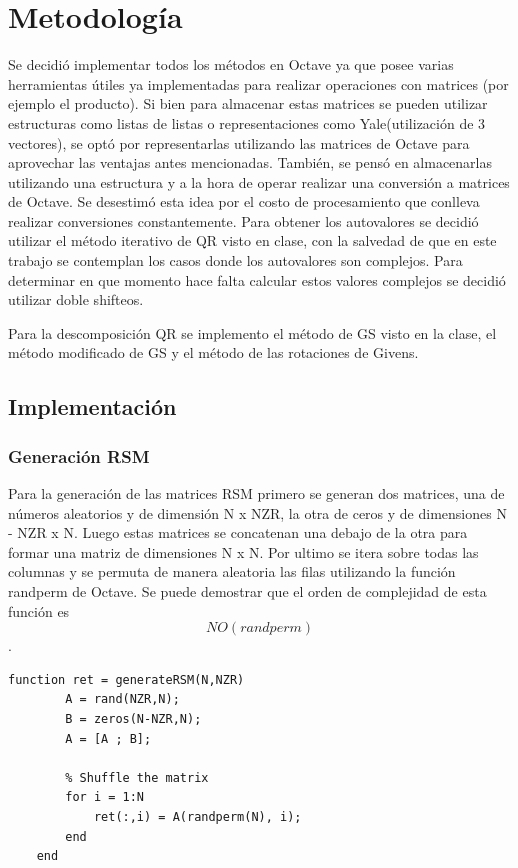 \documentclass[a4paper,10pt,spanish]{article}
\begin{document}
\section{Metodología}
Se decidió implementar todos los métodos en Octave ya que posee varias herramientas útiles ya implementadas para realizar operaciones con matrices (por ejemplo el producto).
Si bien para almacenar estas matrices se pueden utilizar estructuras como listas de listas o representaciones como Yale(utilización de 3 vectores), se optó por representarlas utilizando las matrices de Octave para aprovechar las ventajas antes mencionadas. También, se pensó en almacenarlas utilizando una estructura y a la hora de operar realizar una conversión a matrices de Octave. Se desestimó esta idea por el costo de procesamiento que conlleva realizar conversiones constantemente.
Para obtener los autovalores se decidió utilizar el método iterativo de QR visto en clase, con la salvedad de que en este trabajo se contemplan los casos donde los autovalores son complejos. Para determinar en que momento hace falta calcular estos valores complejos se decidió utilizar doble shifteos.

Para la descomposición QR se implemento el método de GS visto en la clase, el método modificado de GS y el método de las rotaciones de Givens.

\subsection{Implementación}
\subsubsection{Generación RSM}

Para la generación de las matrices RSM primero se generan dos matrices, una de números aleatorios y de dimensión N x NZR, la otra de ceros y de dimensiones N - NZR x N.
Luego estas matrices se concatenan una debajo de la otra para formar una matriz de dimensiones N x N. Por ultimo se itera sobre todas las columnas y se permuta de manera aleatoria las filas utilizando la función randperm de Octave.
Se puede demostrar que el orden de complejidad de esta función es \[N  O ( randperm ) \].
\begin{lstlisting}[caption = Implementación del generador de matrices RSM]
	function ret = generateRSM(N,NZR)
		A = rand(NZR,N);
		B = zeros(N-NZR,N);
		A = [A ; B];

		% Shuffle the matrix
		for i = 1:N
			ret(:,i) = A(randperm(N), i);
		end
	end
\end{lstlisting}
\end{document}

